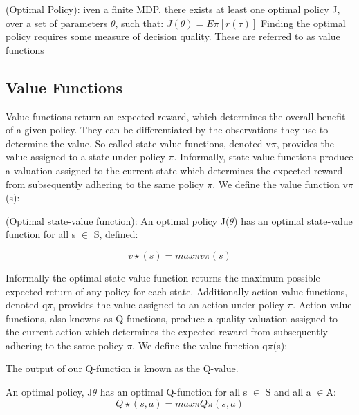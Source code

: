\documentclass[runningheads]{llncs}
\begin{document}
\begin{theorem}
	(Optimal Policy): iven a finite MDP, there exists at least one optimal
	policy J, over a set of parameters $\theta$, such that:
	$J(\theta) = E\pi[r(\tau)]$
	Finding the optimal policy requires some measure of decision quality. These are
	referred to as value functions
\end{theorem}

\subsection{Value Functions}
Value functions return an expected reward, which determines the overall benefit of a given
policy. They can be differentiated by the observations they use to determine the value. So called state-value functions, denoted v$\pi$, provides the value assigned to a state under
policy $\pi$. Informally, state-value functions produce a valuation assigned to the current
state which determines the expected reward from subsequently adhering to the same
policy $\pi$. We define the value function v$\pi$(s):


\begin{theorem}
	(Optimal state-value function): An optimal policy J($\theta$) has an optimal
	state-value function for all s $\in$ S, defined:
	
	\begin{equation}
		v\star(s) = max\pi v\pi(s)
	\end{equation}
\end{theorem}
Informally the optimal state-value function returns the maximum possible expected
return of any policy for each state. Additionally action-value functions, denoted q$\pi$,
provides the value assigned to an action under policy $\pi$. Action-value functions, also
knowns as Q-functions, produce a quality valuation assigned to the current action which
determines the expected reward from subsequently adhering to the same policy $\pi$. We
define the value function q$\pi$(s):
 
The output of our Q-function is known as the Q-value.

\begin{theorem}
An optimal policy, J$\theta$ has an optimal Q-function for
all s $\in$ S and all a $\in$A:
\begin{equation}
	Q\star(s,a) = max\pi Q\pi(s,a)
\end{equation} 
\end{theorem}
\end{document}
